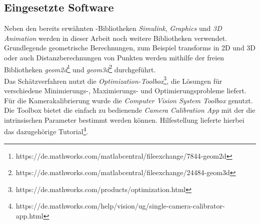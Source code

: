 \subsection{Eingesetzte Software}
Neben den bereits erwähnten \matlab -Bibliotheken \textit{Simulink}, \textit{Graphics} und \textit{3D Animation} werden in dieser Arbeit noch weitere Bibliotheken verwendet.\\
Grundlegende geometrische Berechnungen, zum Beispiel \glspl{transform} in 2D und 3D oder auch Distanzberechnungen von Punkten werden mithilfe der freien Bibliotheken \textit{geom2d}\footnote{https://de.mathworks.com/matlabcentral/fileexchange/7844-geom2d} und \textit{geom3d}\footnote{https://de.mathworks.com/matlabcentral/fileexchange/24484-geom3d} durchgeführt.\\
Das Schätzverfahren nutzt die \textit{Optimization-Toolbox}\footnote{https://de.mathworks.com/products/optimization.html}, die Lösungen für verschiedene Minimierungs-, Maximierungs- und Optimierungsprobleme liefert.\\
Für die Kamerakalibrierung wurde die \textit{Computer Vision System Toolbox} genutzt. Die Toolbox bietet die einfach zu bedienende \textit{Camera Calibration App} mit der die intrinsischen Parameter bestimmt werden können.
Hilfestellung lieferte hierbei das dazugehörige Tutorial\footnote{https://de.mathworks.com/help/vision/ug/single-camera-calibrator-app.html}.\\